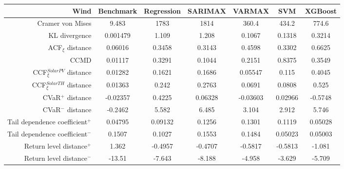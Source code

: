 \newpage
\begin{table}[ht]
    \footnotesize
    \begin{tabular}[l]{r|c|ccc|cc|}
        \toprule
        \textbf{Wind} &Benchmark&Regression&SARIMAX&VARMAX&SVM&XGBoost \\ 
        \midrule            
        Cramer von Mises&9.483&1783&1814&360.4&434.2&774.6 \\
        KL divergence&0.001479&1.109&1.208&0.1067&0.1318&0.3214 \\
        ACF$_\xi$ distance&0.06016&0.3458&0.3143&0.4598&0.3302&0.6625 \\
        \midrule
        CCMD&0.01117&0.3291&0.1044&0.2151&0.8375&0.3549 \\
        CCF$_\xi^{Solar PV}$ distance&0.01282&0.1621&0.1686&0.05547&0.115&0.4045 \\
        CCF$_\xi^{Solar TH}$ distance&0.01363&0.242&0.2763&0.0691&0.0808&0.525 \\
        \midrule
        CVaR$^+$ distance&-0.02357&0.4225&0.06328&-0.03603&0.02966&-0.5748 \\
        CVaR$^-$ distance&-0.2462&5.582&6.485&3.104&2.912&5.746 \\
        Tail dependence coefficient$^+$&0.04795&0.09132&0.1256&0.1301&0.1119&0.05028 \\
        Tail dependence coefficient$^-$&0.1507&0.1027&0.1553&0.1484&0.05023&0.05003 \\
        Return level distance$^+$&1.362&-0.4957&-0.4707&-0.5817&-0.5813&-1.081 \\
        Return level distance$^-$&-13.51&-7.643&-8.188&-4.958&-3.629&-5.709 \\
        \bottomrule
    \end{tabular}
\end{table}
